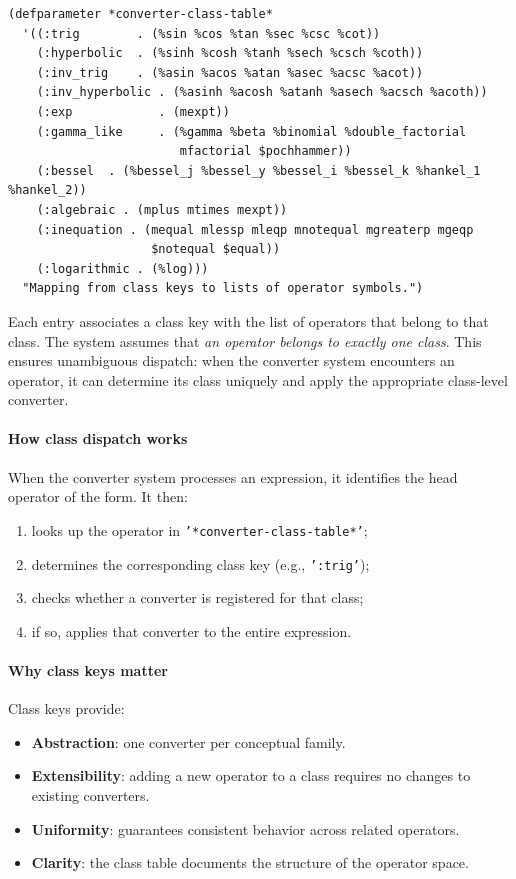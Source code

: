 \documentclass[12pt,fleqn]{extarticle}
\newcommand{\ttq}[1]{\texttt{'#1'}}
\newenvironment{maximabox}
  {\begin{tcolorbox}[
      breakable,
      enhanced,
      colback=white,
      colframe=black!8,
      boxrule=0pt,
      borderline west={2.2pt}{0pt}{black!25},
      arc=1pt,
      left=11pt,
      right=7pt,
      top=9pt,
      bottom=9pt,
      before skip=14pt,
      after skip=14pt
    ]}
  {\end{tcolorbox}}
\begin{document}
\begin{maximabox}
\begin{verbatim}
(defparameter *converter-class-table*
  '((:trig        . (%sin %cos %tan %sec %csc %cot))
    (:hyperbolic  . (%sinh %cosh %tanh %sech %csch %coth))
    (:inv_trig    . (%asin %acos %atan %asec %acsc %acot))
    (:inv_hyperbolic . (%asinh %acosh %atanh %asech %acsch %acoth))
    (:exp            . (mexpt))
    (:gamma_like     . (%gamma %beta %binomial %double_factorial
                        mfactorial $pochhammer))
    (:bessel  . (%bessel_j %bessel_y %bessel_i %bessel_k %hankel_1 %hankel_2))
    (:algebraic . (mplus mtimes mexpt))
    (:inequation . (mequal mlessp mleqp mnotequal mgreaterp mgeqp
                    $notequal $equal))
    (:logarithmic . (%log)))
  "Mapping from class keys to lists of operator symbols.")
\end{verbatim}
\end{maximabox}
Each entry associates a class key with the list of operators that belong to
that class. The system assumes that \emph{an operator belongs to exactly one class}.
This ensures unambiguous dispatch: when the converter system encounters an
operator, it can determine its class uniquely and apply the appropriate
class-level converter.

\paragraph{How class dispatch works} When the converter system processes an expression, it identifies the head operator of the form. It then:
\begin{enumerate}[label=(\alph*), noitemsep, topsep=0pt]
  \item looks up the operator in \ttq{*converter-class-table*};
  \item determines the corresponding class key (e.g., \ttq{:trig});
  \item checks whether a converter is registered for that class;
  \item if so, applies that converter to the entire expression.
\end{enumerate}

\paragraph{Why class keys matter} Class keys provide:
\begin{itemize}
  \item \textbf{Abstraction}: one converter per conceptual family.
  \item \textbf{Extensibility}: adding a new operator to a class requires no
        changes to existing converters.
  \item \textbf{Uniformity}: guarantees consistent behavior across related
        operators.
  \item \textbf{Clarity}: the class table documents the structure of the
        operator space.
\end{itemize}
\end{document}
